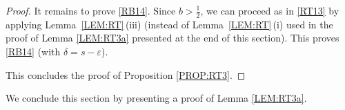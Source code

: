 \documentclass[%
11pt,  reqno]{amsart}
\newcommand{\1}{\hspace{0.2mm}\text{I}\hspace{0.2mm}}
\newcommand{\dl}{\delta}
\newcommand{\eps}{\varepsilon}
\numberwithin{equation}{section}
\numberwithin{theorem}{section}
\begin{document}
\begin{proof}
It remains to prove \eqref{RB14}.
Since $b > \frac 12$, we can proceed as in 
\eqref{RT13}
by applying 
Lemma~\ref{LEM:RT}\,(iii)
(instead of 
Lemma~\ref{LEM:RT}\,(i)
used in 
the proof of Lemma \ref{LEM:RT3a} presented at the end of this section).
This proves \eqref{RB14}
(with $\dl = s- \eps$).















\medskip

This concludes the proof of Proposition \ref{PROP:RT3}.
\end{proof}








We conclude this section by presenting a proof of 
 Lemma \ref{LEM:RT3a}.
\end{document}

